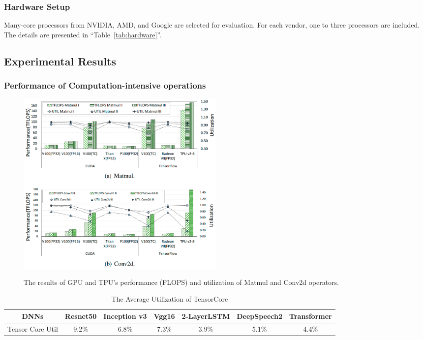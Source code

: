 \subsubsection{Hardware Setup}
Many-core processors from NVIDIA, AMD, and Google are selected for evaluation.
For each vendor, one to three processors are included.
The details are presented in ``Table~\ref{tab:hardware}''.

\subsection{Experimental Results}
\label{subsec:results}
\subsubsection{Performance of Computation-intensive operations}

\begin{figure}[htbp!]
    \centering
    {    \includegraphics[width=0.5\textwidth]{images/cios_gpu_tpu}}
    \caption{The results of GPU and TPU’s performance (FLOPS) and utilization of Matmul and Conv2d operators.}
    \label{fig:cios}
\end{figure}

\begin{table}[t]
    \centering
    \setlength\tabcolsep{8pt}
    \caption{The Average Utilization of TensorCore}
    \begin{tabular}{c c c c c c c}
        \toprule
        DNNs             & Resnet50 & Inception v3 & Vgg16 & 2-LayerLSTM & DeepSpeech2 & Transformer \\
        \midrule
        Tensor Core Util & 9.2\%    & 6.8\%        & 7.3\% & 3.9\%       & 5.1\%       & 4.4\%       \\
        \bottomrule
    \end{tabular}
    \label{tab:tensorutil}
\end{table}

